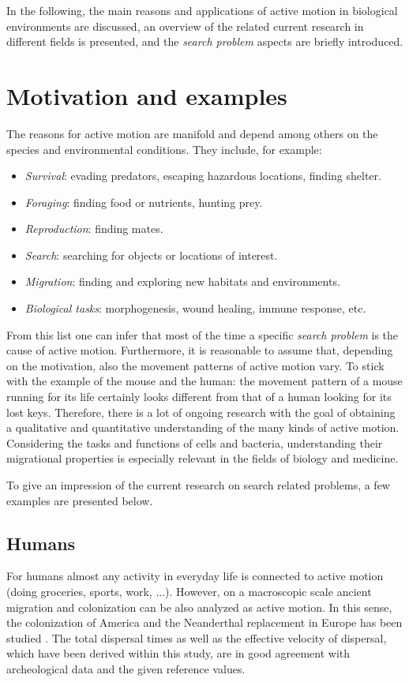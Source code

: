 In the following, the main reasons and applications of active motion in biological environments are discussed, an overview of the related current research in different fields is presented, and the \textit{search problem} aspects are briefly introduced.

\section{Motivation and examples}\label{sec:MotAndExa}
The reasons for active motion are manifold and depend among others on the species and environmental conditions.  They include, for example:

\begin{itemize}
 \item \emph{Survival}: evading predators, escaping hazardous locations, finding shelter.
 \item \emph{Foraging}: finding food or nutrients, hunting prey.
 \item \emph{Reproduction}: finding mates.
 \item \emph{Search}: searching for objects or locations of interest.
 \item \emph{Migration}: finding and exploring new habitats and environments.
 \item \emph{Biological tasks}: \eg morphogenesis, wound healing, immune response, etc.
\end{itemize}

From this list one can infer that most of the time a specific \emph{search problem} is the cause of active motion.
Furthermore, it is reasonable to assume that, depending on the motivation, also the movement patterns of active motion vary. To stick with the example of the mouse and the human: the movement pattern of a mouse running for its life certainly looks different from that of a human looking for its lost keys. Therefore, there is a lot of ongoing research with the goal of obtaining a qualitative and quantitative understanding of the many kinds of active motion. Considering the tasks and functions of cells and bacteria, understanding their migrational properties is especially relevant in the fields of biology and medicine.

To give an impression of the current research on search related problems, a few examples are presented below.

\subsection*{Humans}
For humans almost any activity in everyday life is connected to active motion (\eg doing groceries, sports, work, ...). However, on a macroscopic scale ancient migration and colonization can be also analyzed as active motion. In this sense, the colonization of America and the Neanderthal replacement in Europe has been studied \cite{flores:2007}. The total dispersal times as well as the effective velocity of dispersal, which have been derived within this study, are in good agreement with archeological data and the given reference values.

